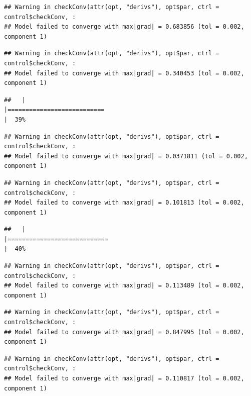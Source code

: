 \documentclass[
  12pt,
]{book}
\begin{document}
\begin{verbatim}
## Warning in checkConv(attr(opt, "derivs"), opt$par, ctrl = control$checkConv, :
## Model failed to converge with max|grad| = 0.683856 (tol = 0.002, component 1)
\end{verbatim}

\begin{verbatim}
## Warning in checkConv(attr(opt, "derivs"), opt$par, ctrl = control$checkConv, :
## Model failed to converge with max|grad| = 0.340453 (tol = 0.002, component 1)
\end{verbatim}

\begin{verbatim}
##   |                                                                              |===========================                                           |  39%
\end{verbatim}

\begin{verbatim}
## Warning in checkConv(attr(opt, "derivs"), opt$par, ctrl = control$checkConv, :
## Model failed to converge with max|grad| = 0.0371811 (tol = 0.002, component 1)
\end{verbatim}

\begin{verbatim}
## Warning in checkConv(attr(opt, "derivs"), opt$par, ctrl = control$checkConv, :
## Model failed to converge with max|grad| = 0.101813 (tol = 0.002, component 1)
\end{verbatim}

\begin{verbatim}
##   |                                                                              |============================                                          |  40%
\end{verbatim}

\begin{verbatim}
## Warning in checkConv(attr(opt, "derivs"), opt$par, ctrl = control$checkConv, :
## Model failed to converge with max|grad| = 0.113489 (tol = 0.002, component 1)
\end{verbatim}

\begin{verbatim}
## Warning in checkConv(attr(opt, "derivs"), opt$par, ctrl = control$checkConv, :
## Model failed to converge with max|grad| = 0.847995 (tol = 0.002, component 1)
\end{verbatim}

\begin{verbatim}
## Warning in checkConv(attr(opt, "derivs"), opt$par, ctrl = control$checkConv, :
## Model failed to converge with max|grad| = 0.110817 (tol = 0.002, component 1)
\end{verbatim}
\end{document}

